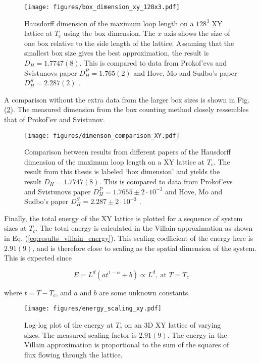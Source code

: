 \begin{figure}[h!]
    \centering
        \texttt{[image: figures/box\_dimension\_xy\_128x3.pdf]}
    \caption{Hausdorff dimension of the maximum loop length on a $128^3$ XY lattice at $T_c$ using the box dimension. The $x$ axis shows the size of one box relative to the side length of the lattice. Assuming that the smallest box size gives the best approximation, the result is $D_H = 1.7747(8)$. This is compared to data from Prokof'evs and Svistunovs paper $D_H^P = 1.765(2)$ \cite{Prokofev:comment_on_hove_hausdorff_crit_fluct} and Hove, Mo and Sudbo's paper $D_H^S = 2.287(2)$ \cite{Hove:hausdorff_crit_fluctuations}.}
    \label{fig:results_boxdimension_xy}
\end{figure}

\newpage

A comparison without the extra data from the larger box sizes is shown in Fig. (\ref{fig:dim_comparison_xy}). The measured dimension from the box counting method closely ressembles that of Prokof'ev and Svistunov.

\begin{figure}[h!]
    \centering
        \texttt{[image: figures/dimenson\_comparison\_XY.pdf]}
    \caption{Comparison between results from different papers of the Hausdorff dimension of the maximum loop length on a XY lattice at $T_c$. The result from this thesis is labeled `box dimension' and yields the result $D_H = 1.7747(8)$. This is compared to data from Prokof'evs and Svistunovs paper $D_H^P = 1.7655 \pm 2 \cdot 10^{-3}$ \cite{Prokofev:comment_on_hove_hausdorff_crit_fluct} and Hove, Mo and Sudbo's paper $D_H^S = 2.287 \pm 2 \cdot 10^{-3}$ \cite{Hove:hausdorff_crit_fluctuations}.}
    \label{fig:dim_comparison_xy}
\end{figure}

\newpage

Finally, the total energy of the XY lattice is plotted for a sequence of system sizes at $T_c$. The total energy is calculated in the Villain approximation as shown in Eq. (\ref{eq:results_villain_energy}). This scaling coefficient of the energy here is $2.91(9)$, and is therefore close to scaling as the spatial dimension of the system. This is expected since 

\begin{equation}
    E = L^d ( a t^{1 - \alpha} + b ) \propto L^d, \ \text{at $T = T_c$}
\end{equation}

\noindent where $t = T - T_c$, and $a$ and $b$ are some unknown constants.

\begin{figure}[h!]
    \centering
        \texttt{[image: figures/energy\_scaling\_xy.pdf]}
    \caption{Log-log plot of the energy at $T_c$ on an 3D XY lattice of varying sizes. The measured scaling factor is $2.91(9)$. The energy in the Villain approximation is proportional to the sum of the squares of flux flowing through the lattice.}
    \label{fig:results_energyxy}
\end{figure}


